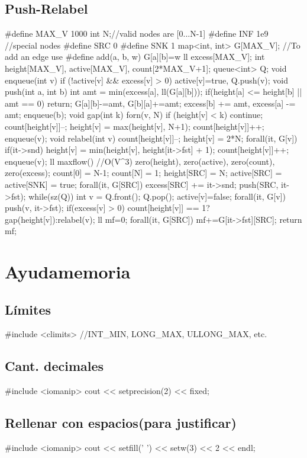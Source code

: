 \documentclass[10pt,landscape,twocolumn,a4paper,notitlepage]{article}
\begin{document}
\subsection{Push-Relabel}
\begin{code}
#define MAX_V 1000
int N;//valid nodes are [0...N-1]
#define INF 1e9
//special nodes
#define SRC 0
#define SNK 1
map<int, int> G[MAX_V];
//To add an edge use
#define add(a, b, w) G[a][b]=w
ll excess[MAX_V];
int height[MAX_V], active[MAX_V], count[2*MAX_V+1];
queue<int> Q;
void enqueue(int v) { 
	if (!active[v] && excess[v] > 0) active[v]=true, Q.push(v); }
void push(int a, int b) {
	int amt = min(excess[a], ll(G[a][b]));
	if(height[a] <= height[b] || amt == 0) return;
	G[a][b]-=amt, G[b][a]+=amt;
	excess[b] += amt, excess[a] -= amt;
	enqueue(b);
}
void gap(int k) {
	forn(v, N){
		if (height[v] < k) continue;
		count[height[v]]--;
		height[v] = max(height[v], N+1);
		count[height[v]]++;
		enqueue(v);
	}
}
void relabel(int v) {
	count[height[v]]--;
	height[v] = 2*N;
	forall(it, G[v])
		if(it->snd)
			height[v] = min(height[v], height[it->fst] + 1);
	count[height[v]]++;
	enqueue(v);
}
ll maxflow() {//O(V^3)
	zero(height), zero(active), zero(count), zero(excess);
	count[0] = N-1;
	count[N] = 1;
	height[SRC] = N;
	active[SRC] = active[SNK] = true;
	forall(it, G[SRC]){
		excess[SRC] += it->snd;
		push(SRC, it->fst);
	}
	while(sz(Q)) {
		int v = Q.front(); Q.pop();
		active[v]=false;
	forall(it, G[v]) push(v, it->fst);
	if(excess[v] > 0) 
		count[height[v]] == 1? gap(height[v]):relabel(v);
	}
	ll mf=0;
	forall(it, G[SRC]) mf+=G[it->fst][SRC];
	return mf;
}
\end{code}
\section{Ayudamemoria}
\subsection*{Límites}
\begin{code}
#include <climits> //INT_MIN, LONG_MAX, ULLONG_MAX, etc.
\end{code}
\subsection*{Cant. decimales}
\begin{code}
#include <iomanip>
cout << setprecision(2) << fixed;
\end{code}
\subsection*{Rellenar con espacios(para justificar)}
\begin{code}
#include <iomanip>
cout << setfill(' ') << setw(3) << 2 << endl;
\end{code}
\end{document}
